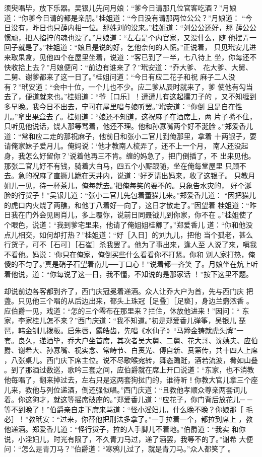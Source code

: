 须臾唱毕，放下乐器。吴银儿先问月娘：“爹今日请那几位官客吃酒？”月娘
道：“你爹今日请的都是亲朋。”桂姐道：“今日没有请那两位公公？”月娘道：
“今日没有，昨日也只薛内相一位。那姓刘的没来。”桂姐道：“刘公公还好，那
薛公公惯顽，把人掐拧的魂也没了。”月娘道：“左右是个内官家，又没什么，随
他摆弄一回子就是了。”桂姐道：“娘且是说的好，乞他奈何的人慌。”正说着，
只见玳安儿进来取果盒，见他四个在屋里坐着，说道：“客已到了一半，七八待上
坐，你每还不快收拾上去？”月娘便问：“前边有谁来了？”玳安道：“乔大爹、
花大爹、大舅、二舅、谢爹都来了这一日了。”桂姐问道：“今日有应二花子和祝
麻子二人没有？”玳安道：“会中十位，一个儿也不少。应二爹从辰时就来了，爹
使他有勾当去了，便道就来也。”桂姐道：“爷［口乐］！遭遭儿有这起攮刀子的
，又不知缠到多早晚。我今日不出去，宁可在屋里唱与娘听罢。”玳安道：“你倒
且是自在性儿。”拿出果盒去了。桂姐道：“娘还不知道，这祝麻子在酒席上，两
片子嘴不住，只听见他说话，饶人那等骂着，他还不理。他和孙寡嘴两个好不涎脸
。”郑爱香儿道：“常和应二走的那祝麻子，他前日和张小二官儿到俺那里，拿着
十两银子，要请俺家妹子爱月儿。俺妈说：‘他才教南人梳弄了，还不上一个月，
南人还没起身，我怎么好留你？’说着他再三不肯。缠的妈急了，把门倒插了，不
出来见他。那张二官儿好不有钱，骑着大白马，四五个小厮跟随，坐在俺每堂屋里
只顾不去。急的祝麻了直撅儿跪在天井内，说道：‘好歹请出妈来，收了这银子。
只教月姐儿一见，待一杯茶儿，俺每就去。’把俺每笑的要不的。只象告水灾的，
好个涎脸的行货子！”吴银儿道：“张小二官儿先包着董猫儿来。”郑爱香儿道：
“因把猫儿的虎口内火烧了两醮，和他丁八着好一向了，这日才散走了。”因望着
桂姐道：“昨日我在门外会见周肖儿，多上覆你，说前日同聂钺儿到你家，你不在
。”桂姐使了个眼色，说道：“我到爹宅里来，他请了俺姐姐桂卿了。”郑爱香儿
道：“你和他没点儿相交，如何却打热？”桂姐道：“好［入日］的刘九儿，把他
当个孤老，甚么行货子，可不［石可］［石崔］杀我罢了。他为了事出来，逢人至
人说了来，嗔我不看他。妈说：‘你只在俺家，俺倒买些什么看看你不打紧。你和
别人家打热，俺傻的不匀了。’真是硝子石望着南儿──丁口心！”说着都一齐笑
了。月娘坐在炕上听着他说，道：“你每说了这一日，我不懂，不知说的是那家话
！”按下这里不题。

却说前边各客都到齐了，西门庆冠冕着递酒。众人让乔大户为首，先与西门庆
把盏。只见他三个唱的从后边出来，都头上珠冠［足叠］［足亵］，身边兰麝浓香
。应伯爵一见，戏道：“怎的三个零布在那里来？拦住，休放他进来！”因问：“
东家，李家桂儿怎不来？”西门庆道：“我不知道。”初是郑爱香儿弹筝，吴银儿
琵琶，韩金钏儿拨板。启朱唇，露皓齿，先唱《水仙子》“马蹄金铸就虎头牌”一
套。良久，递酒毕，乔大户坐首席，其次者吴大舅、二舅、花大哥、沈姨夫、应伯
爵、谢希大、孙寡嘴、祝实念、常峙节、白赉光、傅自新、贲第传，共十四人上席
，八张桌儿。西门庆下席主位。说不尽歌喉宛转，舞态蹁跹，酒若流波，肴如山叠
。到了那酒过数巡，歌吟三套之间，应伯爵就在席上开口说道：“东家，也不消教
他每唱了，翻来掉过去，左右只是这两套狗挝门的，谁待听！你教大官儿拿三个座
儿来，教他与列位递酒，倒还强似唱。”西门庆道：“且教他孝顺众尊亲两套词儿
着。你这狗才，就这等摇席破座的。”郑爱香儿道：“应花子，你门背后放花儿─
─等不到晚了！”伯爵亲自走下席来骂道：“怪小淫妇儿，什么晚不晚？你娘那［
毛必］！”教玳安：“过来，你替他把刑法多拿了。”一手拉着一个，都拉到席上
，教他递酒。郑爱香儿道：“怪行货子，拉的人手脚儿不着地。”伯爵道：“我实
和你说，小淫妇儿，时光有限了，不久青刀马过，递了酒罢，我等不的了。”谢希
大便问：“怎么是青刀马？”伯爵道：“寒鸦儿过了，就是青刀马。”众人都笑了
。

